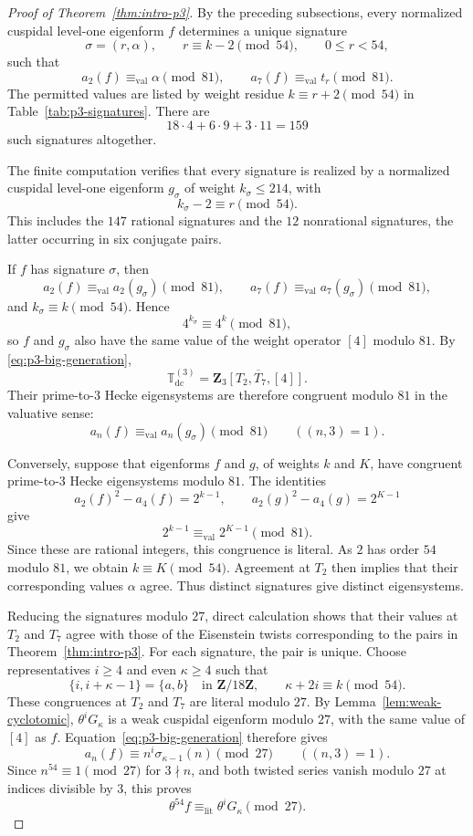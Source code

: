 \documentclass[11pt]{article}
\theoremstyle{plain}
\theoremstyle{definition}
\theoremstyle{remark}
\numberwithin{equation}{section}
\begin{document}
\begin{proof}[Proof of Theorem~\ref{thm:intro-p3}] By the preceding subsections, every normalized cuspidal level-one eigenform \(f\) determines a unique signature \[ \sigma=(r,\alpha), \qquad r\equiv k-2\pmod{54},\qquad 0\leq r<54, \] such that \[ a_2(f)\equiv_{\mathrm{val}}\alpha\pmod{81}, \qquad a_7(f)\equiv_{\mathrm{val}}t_r\pmod{81}. \] The permitted values are listed by weight residue \(k\equiv r+2\pmod{54}\) in Table~\ref{tab:p3-signatures}. There are \[ 18\cdot4+6\cdot9+3\cdot11=159 \] such signatures altogether.

The finite computation \cite[\url{https://github.com/nrustom/hecke-congruences/tree/main/strong_signatures/p3_m4}] {RustomHeckeCongruences} verifies that every signature is realized by a normalized cuspidal level-one eigenform \(g_\sigma\) of weight \(k_\sigma\leq214\), with \[ k_\sigma-2\equiv r\pmod{54}. \] This includes the \(147\) rational signatures and the \(12\) nonrational signatures, the latter occurring in six conjugate pairs.

If \(f\) has signature \(\sigma\), then \[ a_2(f)\equiv_{\mathrm{val}}a_2(g_\sigma)\pmod{81}, \qquad a_7(f)\equiv_{\mathrm{val}}a_7(g_\sigma)\pmod{81}, \] and \(k_\sigma\equiv k\pmod{54}\). Hence \[ 4^{k_\sigma}\equiv4^k\pmod{81}, \] so \(f\) and \(g_\sigma\) also have the same value of the weight operator \([4]\) modulo \(81\). By \eqref{eq:p3-big-generation}, \[ \mathbb T_{\mathrm{dc}}^{(3)} =\overline{\mathbf Z_3[T_2,T_7,[4]]}. \] Their prime-to-\(3\) Hecke eigensystems are therefore congruent modulo \(81\) in the valuative sense: \[ a_n(f)\equiv_{\mathrm{val}}a_n(g_\sigma)\pmod{81} \qquad ((n,3)=1). \]

Conversely, suppose that eigenforms \(f\) and \(g\), of weights \(k\) and \(K\), have congruent prime-to-\(3\) Hecke eigensystems modulo \(81\). The identities \[ a_2(f)^2-a_4(f)=2^{k-1}, \qquad a_2(g)^2-a_4(g)=2^{K-1} \] give \[ 2^{k-1}\equiv_{\mathrm{val}}2^{K-1}\pmod{81}. \] Since these are rational integers, this congruence is literal. As \(2\) has order \(54\) modulo \(81\), we obtain \(k\equiv K\pmod{54}\). Agreement at \(T_2\) then implies that their corresponding values \(\alpha\) agree. Thus distinct signatures give distinct eigensystems.

Reducing the signatures modulo \(27\), direct calculation shows that their values at \(T_2\) and \(T_7\) agree with those of the Eisenstein twists corresponding to the pairs in Theorem~\ref{thm:intro-p3}. For each signature, the pair is unique. Choose representatives \(i\geq4\) and even \(\kappa\geq4\) such that \[ \{i,i+\kappa-1\}=\{a,b\} \quad\text{in }\mathbf Z/18\mathbf Z, \qquad \kappa+2i\equiv k\pmod{54}. \] These congruences at \(T_2\) and \(T_7\) are literal modulo \(27\). By Lemma~\ref{lem:weak-cyclotomic}, \(\theta^iG_\kappa\) is a weak cuspidal eigenform modulo \(27\), with the same value of \([4]\) as \(f\). Equation~\eqref{eq:p3-big-generation} therefore gives \[ a_n(f)\equiv n^i\sigma_{\kappa-1}(n)\pmod{27} \qquad ((n,3)=1). \] Since \(n^{54}\equiv1\pmod{27}\) for \(3\nmid n\), and both twisted series vanish modulo \(27\) at indices divisible by \(3\), this proves \[ \theta^{54}f\equiv_{\mathrm{lit}} \theta^iG_\kappa\pmod{27}. \]


\end{proof}
\end{document}
